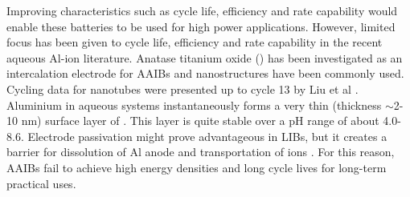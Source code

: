 Improving characteristics such as cycle life, efficiency and rate capability would enable these batteries to be used for high power applications. However, limited focus has been given to cycle life, efficiency and rate capability in the recent aqueous Al-ion literature. Anatase titanium oxide () has been investigated as an intercalation electrode for AAIBs and  nanostructures have been commonly used. Cycling data for  nanotubes were presented up to cycle 13 by Liu et al \cite{liu_aluminum_2012}.  %
Aluminium in aqueous systems instantaneously forms a very thin (thickness $\sim$2-10 nm) surface layer of  \cite{vargel_corrosion_2004}. This layer is quite stable over a pH range of about 4.0-8.6. Electrode passivation might prove advantageous in LIBs, but it creates a barrier for dissolution of Al anode and transportation of  ions \cite{myung_electrochemical_2011}. For this reason, AAIBs fail to achieve high energy densities and long cycle lives for long-term practical uses.

